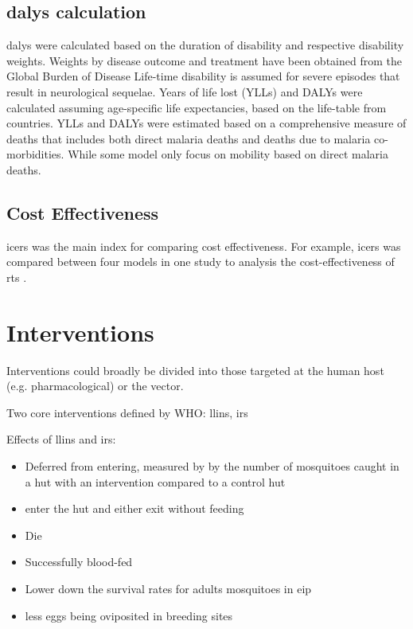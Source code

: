 \documentclass[a4paper, 12pt, twoside]{article}
\begin{document}
\subsection{\texorpdfstring{\gls{dalys} calculation}{DALYs Calculation}}%
\label{sub:dalys_calcualtion}
\gls{dalys} were calculated based on the duration of disability and respective disability weights.
Weights by disease outcome and treatment have been obtained from the Global Burden of Disease Life-time disability is assumed for severe episodes that result in neurological sequelae.
Years of life lost (YLLs) and DALYs were calculated assuming age-specific life expectancies, based on the life-table from countries.
YLLs and DALYs were estimated based on a comprehensive measure of deaths that includes both direct malaria deaths and deaths due to malaria co-morbidities.
While some model only focus on mobility based on direct malaria deaths.

\subsection{Cost Effectiveness}%
\label{sub:cost_effectiveness}
\gls{icers} was the main index for comparing cost effectiveness.
For example, \gls{icers} was compared between four models in one study to analysis the cost-effectiveness of \gls{rts} \cite{Hay2004}.

\section{Interventions}
Interventions could broadly be divided into those targeted at the human host (e.g. pharmacological) or the vector.

Two core interventions defined by WHO: \gls{llins}, \gls{irs}

Effects of \gls{llins} and \gls{irs}:

\begin{itemize}
	\item Deferred from entering, measured by by the number of mosquitoes caught in a hut with an intervention compared to a control hut
	\item enter the hut and either exit without feeding
	\item Die
	\item Successfully blood-fed
	\item Lower down the survival rates for adults mosquitoes in \gls{eip}
	\item less eggs being oviposited in breeding sites
\end{itemize}
\end{document}
